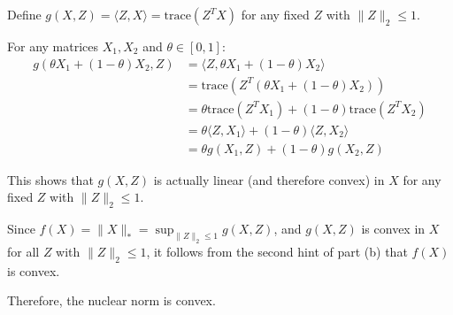 Define $g(X,Z) = \langle Z, X \rangle = \text{trace}(Z^T X)$ for any fixed $Z$ with $\|Z\|_2 \leq 1$.

For any matrices $X_1, X_2$ and $\theta \in [0,1]$:
\begin{align*}
g(\theta X_1 + (1-\theta)X_2, Z) &= \langle Z, \theta X_1 + (1-\theta)X_2 \rangle \\
&= \text{trace}(Z^T(\theta X_1 + (1-\theta)X_2)) \\
&= \theta\text{trace}(Z^T X_1) + (1-\theta)\text{trace}(Z^T X_2) \\
&= \theta \langle Z, X_1 \rangle + (1-\theta)\langle Z, X_2 \rangle \\
&= \theta g(X_1, Z) + (1-\theta)g(X_2, Z)
\end{align*}

This shows that $g(X,Z)$ is actually linear (and therefore convex) in $X$ for any fixed $Z$ with $\|Z\|_2 \leq 1$.

Since $f(X) = \|X\|_* = \sup_{\|Z\|_2 \leq 1} g(X,Z)$, and $g(X,Z)$ is convex in $X$ for all $Z$ with $\|Z\|_2 \leq 1$, it follows from the second hint of part (b) that $f(X)$ is convex.

Therefore, the nuclear norm is convex.

\newpage